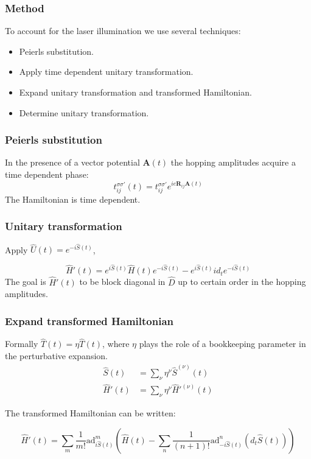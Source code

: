 \documentclass{beamer}
\newcommand{\bs}[1] {\boldsymbol{#1}}
\begin{document}

\begin{frame}
\frametitle{Method}
To account for the laser illumination we use several techniques:
\begin{itemize}
\item Peierls substitution.
\item Apply time dependent unitary transformation.
\item Expand unitary transformation and transformed Hamiltonian.
\item Determine unitary transformation.
\end{itemize}
\end{frame}


\begin{frame}
\frametitle{Peierls substitution}
In the presence of a vector potential $\bs{A}(t)$ the hopping amplitudes acquire a time dependent phase:
\begin{equation*}
\label{TimeDepHopping}
t_{ij}^{\sigma \sigma'}(t) = t_{ij}^{\sigma \sigma'} e^{ie\bs{R}_{ij}\bs{A}(t)}
\end{equation*}
The Hamiltonian is time dependent.
\end{frame}


\begin{frame}
\frametitle{Unitary transformation}
Apply $\hat{U}(t) = e^{-i\hat{S}(t)}$,

\begin{equation*}
\hat{H}'(t) = e^{i\hat{S}(t)} \hat{H}(t) e^{-i\hat{S}(t)} - e^{i\hat{S}(t)} id_t e^{-i\hat{S}(t)}
\end{equation*}
The goal is $\hat{H}'(t)$ to be block diagonal in $\hat{D}$ up to certain order in the hopping amplitudes.
\end{frame}


\begin{frame}
\frametitle{Expand transformed Hamiltonian}
Formally $\hat{T}(t) = \eta\hat{T}(t)$, where $\eta$ plays the role of a bookkeeping parameter in the perturbative expansion.
\begin{align*}
\hat{S}(t) &= \sum_\nu \eta^\nu \hat{S}^{(\nu)}(t) \\
\hat{H}'(t) &= \sum_\nu \eta^\nu \hat{H}'^{(\nu)}(t)
\end{align*}

The transformed Hamiltonian can be written:

\begin{equation*} 
\hat{H}'(t) = \sum_m \frac{1}{m!} \text{ad}_{i\hat{S}(t)}^m \left( \hat{H}(t) - \sum_n \frac{1}{(n+1)!}\text{ad}_{-i\hat{S}(t)}^n (d_t \hat{S}(t)) \right)
\end{equation*}
\end{frame}
\end{document}
